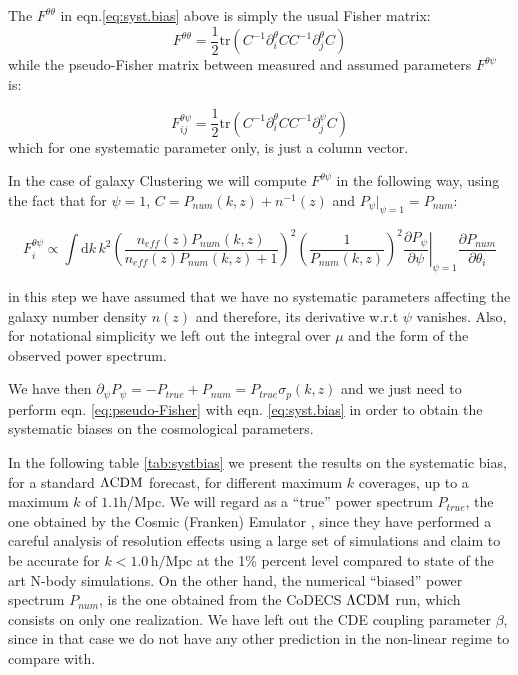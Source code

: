 The $F^{\theta\theta}$ in eqn.\ref{eq:syst.bias} above is simply
the usual Fisher matrix: 
\[
F^{\theta\theta}=\frac{1}{2}\mbox{tr}\left(C^{-1}\partial_{i}^{\theta}CC^{-1}\partial_{j}^{\theta}C\right)
\]
while the pseudo-Fisher matrix between measured and assumed parameters
$F^{\theta\psi}$ is:

\begin{equation}
F_{ij}^{\theta\psi}=\frac{1}{2}\mbox{tr}\left(C^{-1}\partial_{i}^{\theta}CC^{-1}\partial_{j}^{\psi}C\right)
\end{equation}
which for one systematic parameter only, is just a column vector.

In the case of galaxy Clustering we will compute $F^{\theta\psi}$
in the following way, using the fact that for $\psi=1$, $C=P_{num}(k,z)+n^{-1}(z)$
and $P_{\psi}|_{\psi=1}=P_{num}$:

\begin{equation}
F_{i}^{\theta\psi}\propto\int\mbox{d}k\, k^{2}\left(\frac{n_{eff}(z)P_{num}(k,z)}{n_{eff}(z)P_{num}(k,z)+1}\right)^{2}\left(\frac{1}{P_{num}(k,z)}\right)^{2}\left.\frac{\partial P_{\psi}}{\partial\psi}\right|_{\psi=1}\frac{\partial P_{num}}{\partial\theta_{i}}\label{eq:pseudo-Fisher}
\end{equation}


in this step we have assumed that we have no systematic parameters
affecting the galaxy number density $n(z)$ and therefore, its derivative
w.r.t $\psi$ vanishes. Also, for notational simplicity we left out the integral over $\mu$ and the
form of the observed power spectrum.

We have then $\partial_{\psi}P_{\psi}=-P_{true}+P_{num}=P_{true}\sigma_{p}(k,z)$
and we just need to perform eqn. \ref{eq:pseudo-Fisher} with eqn.
\ref{eq:syst.bias} in order to obtain the systematic biases on the
cosmological parameters.

In the following table \ref{tab:systbias} we present the results
on the systematic bias, for a standard $\Lambda\mathrm{CDM}$ forecast, for different
maximum $k$ coverages, up to a maximum $k$ of $1.1$h/Mpc. We will
regard as a ``true'' power spectrum $P_{true}$, the one obtained
by the Cosmic (Franken) Emulator \cite{heitmann_coyote_2014}, since
they have performed a careful analysis of resolution effects using
a large set of simulations and claim to be accurate for $k<1.0\,\mbox{h/Mpc}$
at the 1\% percent level compared to state of the art N-body simulations.
On the other hand, the numerical ``biased'' power spectrum $P_{num}$,
is the one obtained from the CoDECS $\Lambda\mathrm{CDM}$ run, which consists on
only one realization. We have left out the CDE coupling parameter
$\beta$, since in that case we do not have any other prediction in
the non-linear regime to compare with. 



